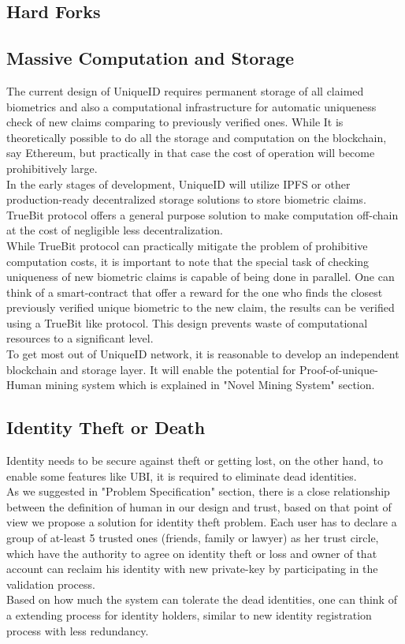\documentclass{article}
\begin{document}
\subsection{Hard Forks}
\subsection{Massive Computation and Storage}
The current design of UniqueID requires permanent storage of all claimed biometrics and also a computational infrastructure for automatic uniqueness check of new claims comparing to previously verified ones. While It is theoretically possible to do all the storage and computation on the blockchain, say Ethereum, but practically in that case the cost of operation will become prohibitively large. \\
In the early stages of development, UniqueID will utilize IPFS or other production-ready decentralized storage solutions to store biometric claims. TrueBit protocol offers a general purpose solution to make computation off-chain at the cost of negligible less decentralization. \\
While TrueBit protocol can practically mitigate the problem of prohibitive computation costs, it is important to note that the special task of checking uniqueness of new biometric claims is capable of being done in parallel. One can think of a smart-contract that offer a reward for the one who finds the closest previously verified unique biometric to the new claim, the results can be verified using a TrueBit like protocol. This design prevents waste of computational resources to a significant level.\\
To get most out of UniqueID network, it is reasonable to develop an independent blockchain and storage layer. It will enable the potential for Proof-of-unique-Human mining system which is explained in "Novel Mining System" section. 
\subsection{Identity Theft or Death}
Identity needs to be secure against theft or getting lost, on the other hand, to enable some features like UBI, it is required to eliminate dead identities.\\
As we suggested in "Problem Specification" section, there is a close relationship between the definition of human in our design and trust, based on that point of view we propose a solution for identity theft problem. Each user has to declare a group of at-least 5 trusted ones (friends, family or lawyer) as her trust circle, which have the authority to agree on identity theft or loss and owner of that account can reclaim his identity with new private-key by participating in the validation process.\\
Based on how much the system can tolerate the dead identities, one can think of a extending process for identity holders, similar to new identity registration process with less redundancy.
\end{document}
